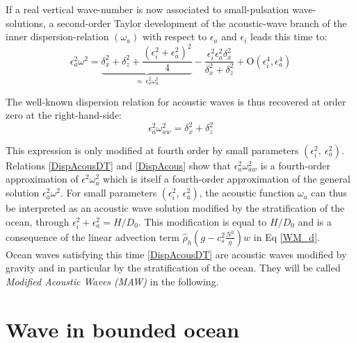 \documentclass[a4paper,11pt]{article}
\begin{document}
If a real vertical wave-number is now associated to small-pulsation wave-solutions, a second-order Taylor development of the acoustic-wave branch of the inner dispersion-relation $(\omega_a)$  with respect to $\epsilon_a$ and $\epsilon_i$ leads this time to:
\begin{equation}
		\epsilon_a^2\omega^2 =
		\underbrace{\delta_x^2+\delta_z^2
		+\frac{(\epsilon_i^2+\epsilon_a^2)^2}{4}}
		_{\approx\ \epsilon_a^2\omega_a^2}
		-\frac{\epsilon_i^2\epsilon_a^2\delta_x^2}{\delta_x^2+\delta_z^2}
		+\mathrm{O}(\epsilon_i^4,\epsilon_a^4)
		\label{DispAcousDT}
\end{equation}

The well-known dispersion relation for acoustic waves is thus recovered at order zero at the right-hand-side:
\begin{equation}
	\epsilon_a^2\omega_{aw}^2 =\delta_x^2+\delta_z^2
	\label{DispAcous}
\end{equation}

This expression is only modified at fourth order by small parameters $(\epsilon_i^2,\ \epsilon_a^2)$. Relations \ref{DispAcousDT} and \ref{DispAcous} show that $\epsilon_a^2 \omega_{aw}^2$ is a fourth-order approximation of $\epsilon^2 \omega_a^2$ which is itself a fourth-order approximation of the general solution $\epsilon_a^2 \omega^2$.
For small parameters $(\epsilon_i^2,\ \epsilon_a^2)$, the acoustic function $\omega_a$ can thus be interpreted as an acoustic wave solution modified by the stratification of the ocean, through $\epsilon_i^2+\epsilon_a^2=H/D_0$. This modification is equal to $H/D_0$ and is a consequence of the linear advection term $\hat{\rho}_h(g-c_s^2 \frac{N^2}{g})w$ in Eq \ref{WM_d}.\\
Ocean waves satisfying this time \ref{DispAcousDT} are acoustic waves modified by gravity and in particular by the stratification of the ocean. They will be called \textit{Modified Acoustic Waves (MAW)} in the following.

\newpage
\section{Wave in bounded ocean}
\label{SectionGraphic}
\end{document}
